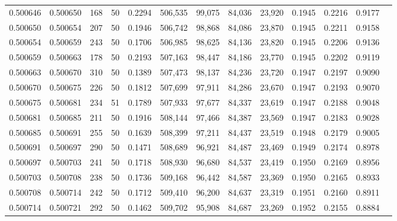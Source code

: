 \begin{tabular}{rrrrrrrrrrrrr}
0.500646 & 0.500650 & 168 &  50 &                                     0.2294 & 506,535 &  99,075 &  84,036 &  23,920 & 0.1945 & 0.2216 & 0.9177 \\
0.500650 & 0.500654 & 207 &  50 &                                     0.1946 & 506,742 &  98,868 &  84,086 &  23,870 & 0.1945 & 0.2211 & 0.9158 \\
0.500654 & 0.500659 & 243 &  50 &                                     0.1706 & 506,985 &  98,625 &  84,136 &  23,820 & 0.1945 & 0.2206 & 0.9136 \\
0.500659 & 0.500663 & 178 &  50 &                                     0.2193 & 507,163 &  98,447 &  84,186 &  23,770 & 0.1945 & 0.2202 & 0.9119 \\
0.500663 & 0.500670 & 310 &  50 &                                     0.1389 & 507,473 &  98,137 &  84,236 &  23,720 & 0.1947 & 0.2197 & 0.9090 \\
0.500670 & 0.500675 & 226 &  50 &                                     0.1812 & 507,699 &  97,911 &  84,286 &  23,670 & 0.1947 & 0.2193 & 0.9070 \\
0.500675 & 0.500681 & 234 &  51 &                                     0.1789 & 507,933 &  97,677 &  84,337 &  23,619 & 0.1947 & 0.2188 & 0.9048 \\
0.500681 & 0.500685 & 211 &  50 &                                     0.1916 & 508,144 &  97,466 &  84,387 &  23,569 & 0.1947 & 0.2183 & 0.9028 \\
0.500685 & 0.500691 & 255 &  50 &                                     0.1639 & 508,399 &  97,211 &  84,437 &  23,519 & 0.1948 & 0.2179 & 0.9005 \\
0.500691 & 0.500697 & 290 &  50 &                                     0.1471 & 508,689 &  96,921 &  84,487 &  23,469 & 0.1949 & 0.2174 & 0.8978 \\
0.500697 & 0.500703 & 241 &  50 &                                     0.1718 & 508,930 &  96,680 &  84,537 &  23,419 & 0.1950 & 0.2169 & 0.8956 \\
0.500703 & 0.500708 & 238 &  50 &                                     0.1736 & 509,168 &  96,442 &  84,587 &  23,369 & 0.1950 & 0.2165 & 0.8933 \\
0.500708 & 0.500714 & 242 &  50 &                                     0.1712 & 509,410 &  96,200 &  84,637 &  23,319 & 0.1951 & 0.2160 & 0.8911 \\
0.500714 & 0.500721 & 292 &  50 &                                     0.1462 & 509,702 &  95,908 &  84,687 &  23,269 & 0.1952 & 0.2155 & 0.8884 \\

\end{tabular}
